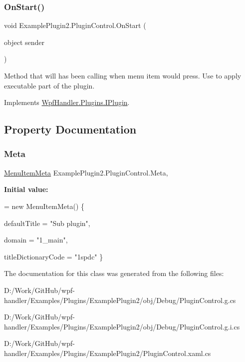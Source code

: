 \subsubsection{\texorpdfstring{On\+Start()}{OnStart()}}
{\footnotesize\ttfamily void Example\+Plugin2.\+Plugin\+Control.\+On\+Start (\begin{DoxyParamCaption}\item[{object}]{sender }\end{DoxyParamCaption})}



Method that will has been calling when menu item would press. Use to apply executable part of the plugin. 



Implements \mbox{\hyperlink{interface_wpf_handler_1_1_plugins_1_1_i_plugin_aabe1a8e5680ebeb37f96ffe86b6123e9}{Wpf\+Handler.\+Plugins.\+I\+Plugin}}.



\subsection{Property Documentation}
\mbox{\label{class_example_plugin2_1_1_plugin_control_a1cbb95e92421637902507bca1e94049d}} 
\subsubsection{\texorpdfstring{Meta}{Meta}}
{\footnotesize\ttfamily \mbox{\hyperlink{class_wpf_handler_1_1_plugins_1_1_menu_item_meta}{Menu\+Item\+Meta}} Example\+Plugin2.\+Plugin\+Control.\+Meta\hspace{0.3cm}{\ttfamily [get]}, {\ttfamily [set]}}

{\bfseries Initial value\+:}
\begin{DoxyCode}
= \textcolor{keyword}{new} MenuItemMeta()
        \{
            
            defaultTitle = \textcolor{stringliteral}{"Sub plugin"},

            
            domain = \textcolor{stringliteral}{"1\_main"},

            
            titleDictionaryCode = \textcolor{stringliteral}{"1spdc"}
        \}
\end{DoxyCode}


The documentation for this class was generated from the following files\+:\begin{DoxyCompactItemize}
\item 
D\+:/\+Work/\+Git\+Hub/wpf-\/handler/\+Examples/\+Plugins/\+Example\+Plugin2/obj/\+Debug/Plugin\+Control.\+g.\+cs\item 
D\+:/\+Work/\+Git\+Hub/wpf-\/handler/\+Examples/\+Plugins/\+Example\+Plugin2/obj/\+Debug/Plugin\+Control.\+g.\+i.\+cs\item 
D\+:/\+Work/\+Git\+Hub/wpf-\/handler/\+Examples/\+Plugins/\+Example\+Plugin2/Plugin\+Control.\+xaml.\+cs\end{DoxyCompactItemize}
